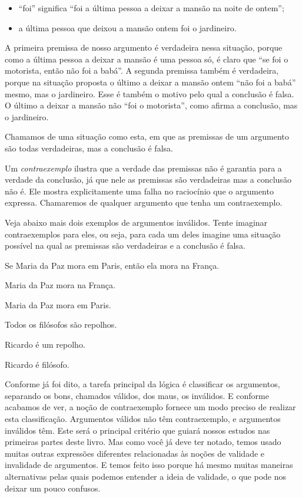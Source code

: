 \begin{itemize}\label{contraexemplo}
	\item ``foi'' significa ``foi a última pessoa a deixar a mansão na noite de ontem'';
	\item  a última pessoa que deixou a mansão ontem foi o jardineiro.
\end {itemize}
A primeira premissa de nosso argumento é verdadeira nessa situação, porque como a última pessoa a deixar a mansão é uma pessoa só, é claro que ``se foi o motorista, então não foi a babá''.
A segunda premissa também é verdadeira, porque na situação proposta o último a deixar a mansão ontem ``não foi a babá'' mesmo, mas o jardineiro.
Esse é também o motivo pelo qual a  conclusão é falsa.
O último a deixar a mansão não ``foi o motorista'', como afirma a conclusão, mas o jardineiro.

Chamamos de   uma situação como esta, em que as premissas de um argumento são todas verdadeiras, mas a conclusão é falsa.

Um \textit{contraexemplo} ilustra que a verdade das premissas não é garantia para a verdade da conclusão, já que nele as premissas são verdadeiras mas a conclusão não é.
Ele mostra explicitamente  uma falha no raciocínio que o argumento expressa.
Chamaremos de  qualquer argumento que tenha um contraexemplo.

Veja abaixo mais dois exemplos de argumentos inválidos. Tente imaginar contraexemplos para eles, ou seja, para cada um deles imagine uma situação possível na qual as premissas são verdadeiras e a conclusão é falsa.
\begin{earg}
	\item[] Se Maria da Paz mora em Paris, então ela mora na França.
	\item[] Maria da Paz mora na França.
	\item[\therefore] Maria da Paz mora em Paris.
\end{earg}

\begin{earg}
	\item[] Todos os filósofos são repolhos.
	\item[] Ricardo é um repolho.
	\item[\therefore] Ricardo é filósofo.
\end{earg}
Conforme já foi dito, a tarefa principal da lógica é classificar os argumentos, separando os bons, chamados válidos, dos maus, os inválidos.
E conforme acabamos de ver, a noção de contraexemplo fornece um modo preciso de realizar esta classificação. 
Argumentos válidos não têm contraexemplo, e argumentos inválidos têm.
Este será o principal critério que guiará nossos estudos nas primeiras partes deste livro.
Mas como você já deve ter notado, temos usado muitas outras expressões diferentes relacionadas às noções de validade e invalidade de argumentos.
E temos feito isso porque há mesmo muitas maneiras alternativas pelas quais podemos entender a ideia de validade, o que pode nos deixar um pouco confusos.


